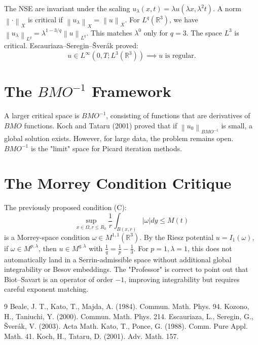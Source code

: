 \documentclass[11pt,a4paper]{amsart}
\newcommand{\norm}[1]{\left\|#1\right\|}
\newcommand{\abs}[1]{\left|#1\right|}
\newcommand{\R}{\mathbb{R}}
\begin{document}
The NSE are invariant under the scaling $u_\lambda(x,t) = \lambda u(\lambda x, \lambda^2 t)$.
A norm $\norm{\cdot}_X$ is critical if $\norm{u_\lambda}_X = \norm{u}_X$.
For $L^q(\R^3)$, we have $\norm{u_\lambda}_{L^q} = \lambda^{1 - 3/q} \norm{u}_{L^q}$.
This matches $\lambda^0$ only for $q=3$.
The space $L^3$ is critical. Escauriaza--Seregin--\v{S}ver\'ak proved:
\begin{equation}
u \in L^\infty(0, T; L^3(\R^3)) \implies u \text{ is regular}.
\end{equation}

\section{The $BMO^{-1}$ Framework}

A larger critical space is $BMO^{-1}$, consisting of functions that are derivatives of $BMO$ functions. Koch and Tataru (2001) proved that if $\norm{u_0}_{BMO^{-1}}$ is small, a global solution exists.
However, for large data, the problem remains open. $BMO^{-1}$ is the "limit" space for Picard iteration methods.

\section{The Morrey Condition Critique}

The previously proposed condition (C):
\begin{equation}
\sup_{x \in \Omega, r \le R_0} \frac{1}{r} \int_{B(x,r)} \abs{\omega} dy \le M(t)
\end{equation}
is a Morrey-space condition $\omega \in M^{1,1}(\R^3)$. 
By the Riesz potential $u = I_1(\omega)$, if $\omega \in M^{p, \lambda}$, then $u \in M^{q, \lambda}$ with $\frac{1}{q} = \frac{1}{p} - \frac{1}{3}$.
For $p=1, \lambda=1$, this does not automatically land in a Serrin-admissible space without additional global integrability or Besov embeddings. The "Professor" is correct to point out that Biot--Savart is an operator of order $-1$, improving integrability but requires careful exponent matching.

\begin{thebibliography}{9}
 Beale, J. T., Kato, T., Majda, A. (1984). Commun. Math. Phys. 94.
 Kozono, H., Taniuchi, Y. (2000). Commun. Math. Phys. 214.
 Escauriaza, L., Seregin, G., \v{S}ver\'ak, V. (2003). Acta Math.
 Kato, T., Ponce, G. (1988). Comm. Pure Appl. Math. 41.
 Koch, H., Tataru, D. (2001). Adv. Math. 157.
\end{thebibliography}
\end{document}
